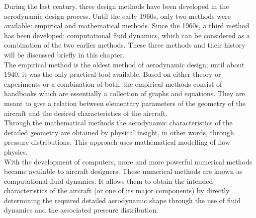 During the last century, three design methods have been developed in the aerodynamic design process. Until the early 1960s, only two methods were available: empirical and mathematical methods. Since the 1960s, a third method has been developed: computational fluid dynamics, which can be considered as a combination of the two earlier methods. These three methods and their history will be discussed briefly in this chapter. \\
The empirical method  is the oldest method of aerodynamic design; until about 1940, it was the only practical tool available. Based on either theory or experiments or a combination of both, the empirical methods consist of handbooks which are essentially a collection of graphs and equations. They are meant to give a relation between elementary parameters of the geometry of the aircraft and the desired characteristics of the aircraft.\\
Through the mathematical methods the aerodynamic characteristics of the detailed geometry are obtained by physical insight, in other words, through pressure distributions. This approach uses mathematical modelling of flow physics.\\
With the development of computers, more and more powerful numerical methods became available to aircraft designers. These numerical methods are known as computational fluid dynamics. It allows them to obtain the intended characteristics of the aircraft (or one of its major components) by directly determining the required detailed aerodynamic shape through the use of fluid dynamics and the associated pressure distribution.\cite{obert2009aerodynamic}

